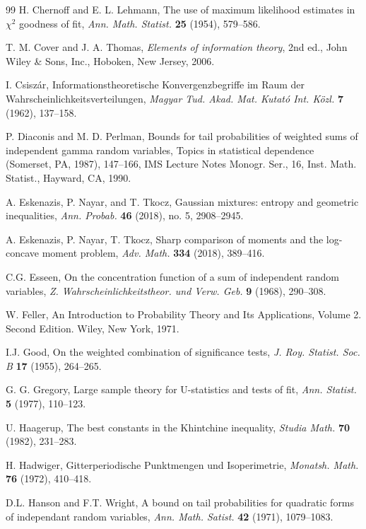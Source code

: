 \documentclass[11pt]{amsart}
\newcommand{\1}{\mathbf{1}}
\theoremstyle{definition}
\theoremstyle{definition}
\theoremstyle{remark}
\begin{document}
\begin{thebibliography}{99}
 H. Chernoff and E. L. Lehmann,  The use of maximum likelihood estimates in $\chi^2$ goodness of fit, \textit{Ann. Math. Statist.} \textbf{25} (1954), 579--586.

 T. M. Cover and J. A. Thomas, \textit{Elements of information theory}, 2nd ed., John Wiley \& Sons, Inc., Hoboken, New Jersey, 2006.

 I. Csisz\'ar, Informationstheoretische Konvergenzbegriffe im Raum der Wahrscheinlichkeitsverteilungen, \textit{Magyar Tud. Akad. Mat. Kutató Int. Közl.} \textbf{7} (1962), 137--158.

 P. Diaconis and M. D. Perlman,  Bounds for tail probabilities of weighted sums of
independent gamma random variables, Topics in statistical dependence (Somerset, PA, 1987), 147–166, IMS Lecture Notes Monogr. Ser., 16, Inst. Math. Statist., Hayward, CA, 1990.

 A. Eskenazis, P. Nayar, and T. Tkocz, Gaussian mixtures: entropy and geometric inequalities, \textit{Ann. Probab.} \textbf{46} (2018), no. 5, 2908--2945. 

 A. Eskenazis, P. Nayar, T. Tkocz, Sharp comparison of moments and the log-concave moment problem, \textit{Adv.  Math.} \textbf{334} (2018), 389--416.

 C.G. Esseen, On the concentration function of a sum of independent random variables, \textit{Z. Wahrscheinlichkeitstheor. und Verw. Geb.}  \textbf{9} (1968), 290--308.

 W. Feller, An Introduction to Probability Theory and Its Applications, Volume 2. Second Edition. Wiley, New York, 1971.

 I.J. Good, On the weighted combination of significance tests, \textit{J. Roy. Statist.
Soc. B}  \textbf{17} (1955), 264--265.

 G. G. Gregory, Large sample theory for U-statistics and tests of fit,  \textit{Ann. Statist.} \textbf{5} (1977), 110--123.

 U. Haagerup, The best constants in the Khintchine inequality, \textit{Studia Math.} \textbf{70} (1982), 231--283.

 H. Hadwiger, Gitterperiodische Punktmengen und Isoperimetrie, \textit{Monatsh. Math.} \textbf{76} (1972), 410--418.

 D.L. Hanson and F.T. Wright,  A bound on tail probabilities for quadratic forms of
independant random variables, \textit{Ann. Math. Satist.} \textbf{42} (1971), 1079--1083.


\end{thebibliography}
\end{document}
